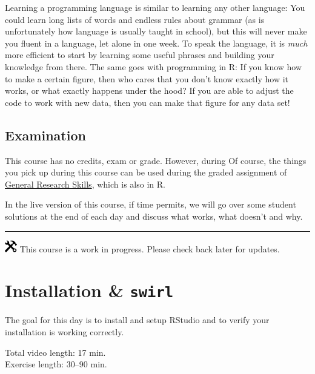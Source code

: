 \documentclass[
]{book}
\begin{document}
Learning a programming language is similar to learning any other language: You could learn long lists of words and endless rules about grammar (as is unfortunately how language is usually taught in school), but this will never make you fluent in a language, let alone in one week. To speak the language, it is \emph{much} more efficient to start by learning some useful phrases and building your knowledge from there. The same goes with programming in R: If you know how to make a certain figure, then who cares that you don't know exactly how it works, or what exactly happens under the hood? If you are able to adjust the code to work with new data, then you can make that figure for any data set!

\hypertarget{examination}{%
\section*{Examination}\label{examination}}

This course has no credits, exam or grade. However, during Of course, the things you pick up during this course can be used during the graded assignment of \href{https://ibl-inspire.github.io/General-Research-Skills/}{General Research Skills}, which is also in R.

In the live version of this course, if time permits, we will go over some student solutions at the end of each day and discuss what works, what doesn't and why.

\begin{center}\rule{0.5\linewidth}{0.5pt}\end{center}

\includegraphics[width=0.20833in,height=0.20833in]{figures/underconstruction.png} This course is a work in progress. Please check back later for updates.

\hypertarget{installation}{%
\chapter{\texorpdfstring{Installation \& \texttt{swirl}}{Installation \& swirl}}\label{installation}}

The goal for this day is to install and setup RStudio and to verify your installation is working correctly.

Total video length: 17 min.\\
Exercise length: 30--90 min.
\end{document}
